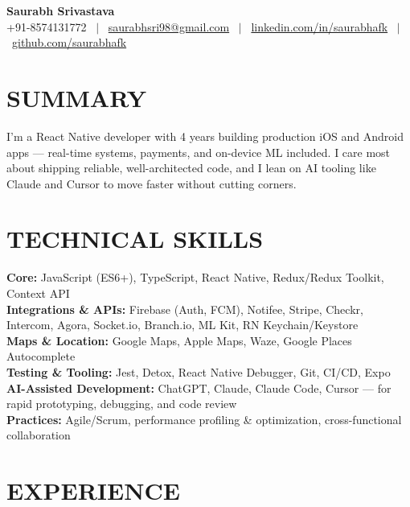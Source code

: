 \documentclass[10.5pt,letterpaper]{article}
\begin{document}
\begin{center}
  {\fontsize{20}{22}\selectfont\bfseries\color{navy} Saurabh Srivastava}\\[3pt]
  {\fontsize{9.5}{11}\selectfont\color{grey}
    +91-8574131772 \ $|$ \
    \href{mailto:saurabhsri98@gmail.com}{saurabhsri98@gmail.com} \ $|$ \
    \href{https://linkedin.com/in/saurabhafk}{linkedin.com/in/saurabhafk} \ $|$ \
    \href{https://github.com/saurabhafk}{github.com/saurabhafk}
  }
\end{center}
\vspace{-4pt}

\section{SUMMARY}
\fontsize{9.5}{11.2}\selectfont
I'm a React Native developer with 4 years building production iOS and Android apps --- real-time systems, payments, and on-device ML included. I care most about shipping reliable, well-architected code, and I lean on AI tooling like Claude and Cursor to move faster without cutting corners.

\section{TECHNICAL SKILLS}
\fontsize{9.5}{11.2}\selectfont
\textbf{Core:} JavaScript (ES6+), TypeScript, React Native, Redux/Redux Toolkit, Context API\\[2pt]
\textbf{Integrations \& APIs:} Firebase (Auth, FCM), Notifee, Stripe, Checkr, Intercom, Agora, Socket.io, Branch.io, ML Kit, RN Keychain/Keystore\\[2pt]
\textbf{Maps \& Location:} Google Maps, Apple Maps, Waze, Google Places Autocomplete\\[2pt]
\textbf{Testing \& Tooling:} Jest, Detox, React Native Debugger, Git, CI/CD, Expo\\[2pt]
\textbf{AI-Assisted Development:} ChatGPT, Claude, Claude Code, Cursor --- for rapid prototyping, debugging, and code review\\[2pt]
\textbf{Practices:} Agile/Scrum, performance profiling \& optimization, cross-functional collaboration

\section{EXPERIENCE}
\end{document}
